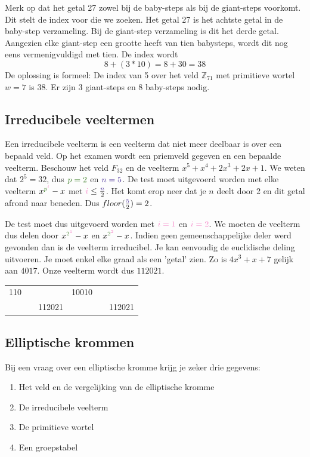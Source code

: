 Merk op dat het getal 27 zowel bij de baby-steps als bij de giant-steps voorkomt. Dit stelt de index voor die we zoeken. Het getal 27 is het achtste getal in de baby-step verzameling. Bij de giant-step verzameling is dit het derde getal. Aangezien elke giant-step een grootte heeft van tien babysteps, wordt dit nog eens vermenigvuldigd met tien. De index wordt $$8 + (3 * 10) = 8 + 30 = 38$$
De oplossing is formeel: De index van 5 over het veld $\mathbb{Z}_{71}$ met primitieve wortel $w = 7$ is 38. Er zijn 3 giant-steps en 8 baby-steps nodig.

\subsection{Irreducibele veeltermen}
Een irreducibele veelterm is een veelterm dat niet meer deelbaar is over een bepaald veld. Op het examen wordt een priemveld gegeven en een bepaalde veelterm. Beschouw het veld $F_{32}$ en de veelterm $x^5 + x^4 + 2x^3 + 2x + 1$. We weten dat $2^5 = 32$, dus $\acca{p = 2}$ en $\accc{n = 5}$. De test moet uitgevoerd worden met elke veelterm $x^{\acca{p}^{\accb{i}}} - x$ met $\accb{i} \leq \frac{\accc{n}}{2}$. Het komt erop neer dat je $n$ deelt door 2 en dit getal afrond naar beneden. Dus $floor(\frac{\accc{5}}{2}) = 2$. 

De test moet dus uitgevoerd worden met $\accb{i = 1}$ en $\accb{i = 2}$. We moeten de veelterm  dus delen door $x^{\acca{2}^{\accb{1}}} - x$ en $x^{\acca{2}^{\accb{2}}} - x$. Indien geen gemeenschappelijke deler werd gevonden dan is de veelterm irreducibel. Je kan eenvoudig de euclidische deling uitvoeren. Je moet enkel elke graad als een 'getal' zien. Zo is $4x^3 + x + 7$ gelijk aan $4017$. Onze veelterm wordt dus $112021$. 
\begin{center}
\begin{tabular}{c c c | c c c}
 110 &  &        & 10010 &  &\\
     &  & 112021 &       &  & 112021
\end{tabular}
\end{center}



\subsection{Elliptische krommen}
Bij een vraag over een elliptische kromme krijg je zeker drie gegevens:
\begin{enumerate}
 \item Het veld en de vergelijking van de elliptische kromme
 \item De irreducibele veelterm
 \item De primitieve wortel
 \item Een groepstabel
\end{enumerate}

